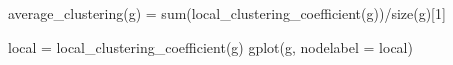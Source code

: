 \message{ !name(ps1.tex)}\documentclass[a4paper,12pt]{article}
\begin{document}
average_clustering(g) = sum(local_clustering_coefficient(g))/size(g)[1]

local = local_clustering_coefficient(g)
gplot(g, nodelabel = local)
\end{document}
